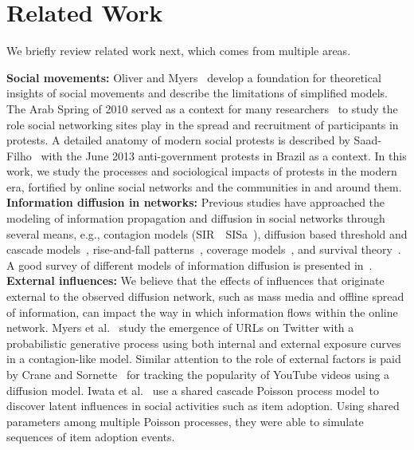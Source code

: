 \section{Related Work}
We briefly review related work next, which comes from multiple areas.

\par \noindent
{\bf Social movements:}
Oliver and Myers~\cite{oliver1998diffusion}
develop a foundation for theoretical insights of social movements and
describe the limitations of simplified models. The Arab Spring of  2010
served as a context for many
researchers~\cite{gonzalez2011dynamics, bond201261, tufekci2012social, conover2013digital, saad2013mass}
to study the role
social networking sites play in the spread and recruitment
of participants in protests.
A detailed anatomy of
modern social protests is described by Saad-Filho~\cite{saad2013mass}
with the June 2013 anti-government protests in Brazil as a context.
In this work, we study the processes and sociological impacts of protests
in the modern era, fortified by online social networks and the
communities in and around them.\\

\vspace{-0.1in}
\noindent
{\bf Information diffusion in networks:}
Previous studies have approached the modeling of information propagation and
diffusion in social networks through several means, e.g.,
contagion models (SIR~\cite{castellini2007propagation}\, SISa~\cite{hill2010emotions}), diffusion based threshold and cascade models~\cite{kempe2003maximizing}, rise-and-fall patterns~\cite{matsubara2012rise}, coverage models~\cite{singer2012win}, and survival theory~\cite{rodriguez2013modeling}. A good survey of
different models of information diffusion is presented in~\cite{guille2013information}.\\

\vspace{-0.1in}
\noindent
{\bf External influences:}
We believe that the effects of influences that originate external
to the observed diffusion network, such as mass media
and offline spread of information, can impact the way in which information
flows within the online network.
Myers et al.~\cite{myers2012information} study the emergence of URLs
on Twitter with a probabilistic generative process using both
internal and external exposure curves in a contagion-like model.
Similar attention to the role of external factors is
paid by Crane and Sornette~\cite{crane2008robust} for
tracking the popularity of YouTube videos using a diffusion model.
Iwata et al.~\cite{iwata2013discovering} use
a shared cascade Poisson process model to discover
latent influences in social activities such as item adoption.
Using shared parameters among multiple Poisson processes, they were able to simulate sequences of item adoption events. \\

